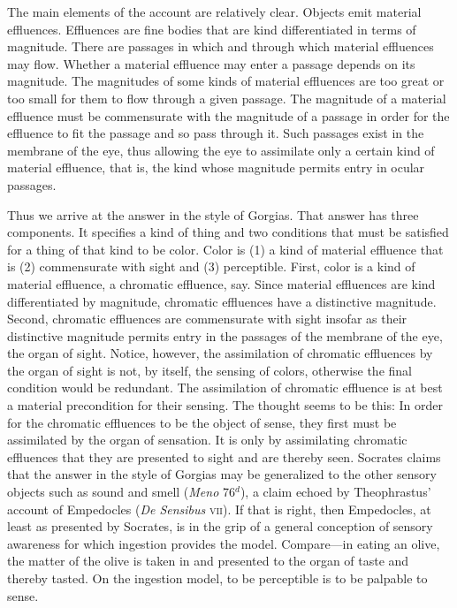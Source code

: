 The main elements of the account are relatively clear. Objects emit material effluences. Effluences are fine bodies that are kind differentiated in terms of magnitude. There are passages in which and through which material effluences may flow. Whether a material effluence may enter a passage depends on its magnitude. The magnitudes of some kinds of material effluences are too great or too small for them to flow through a given passage. The magnitude of a material effluence must be commensurate with the magnitude of a passage in order for the effluence to fit the passage and so pass through it. Such passages exist in the membrane of the eye, thus allowing the eye to assimilate only a certain kind of material effluence, that is, the kind whose magnitude permits entry in ocular passages.

Thus we arrive at the answer in the style of Gorgias. That answer has three components. It specifies a kind of thing and two conditions that must be satisfied for a thing of that kind to be color. Color is (1) a kind of material effluence that is (2) commensurate with sight and (3) perceptible. First, color is a kind of material effluence, a chromatic effluence, say. Since material effluences are kind differentiated by magnitude, chromatic effluences have a distinctive magnitude. Second, chromatic effluences are commensurate with sight insofar as their distinctive magnitude permits entry in the passages of the membrane of the eye, the organ of sight. Notice, however, the assimilation of chromatic effluences by the organ of sight is not, by itself, the sensing of colors, otherwise the final condition would be redundant. The assimilation of chromatic effluence is at best a material precondition for their sensing. The thought seems to be this: In order for the chromatic effluences to be the object of sense, they first must be assimilated by the organ of sensation. It is only by assimilating chromatic effluences that they are presented to sight and are thereby seen. Socrates claims that the answer in the style of Gorgias may be generalized to the other sensory objects such as sound and smell (\emph{Meno} 76\( ^{d} \)), a claim echoed by Theophrastus' account of Empedocles (\emph{De Sensibus} \textsc{vii}). If that is right, then Empedocles, at least as presented by Socrates, is in the grip of a general conception of sensory awareness for which ingestion provides the model. Compare---in eating an olive, the matter of the olive is taken in and presented to the organ of taste and thereby tasted. On the ingestion model, to be perceptible is to be palpable to sense. 


